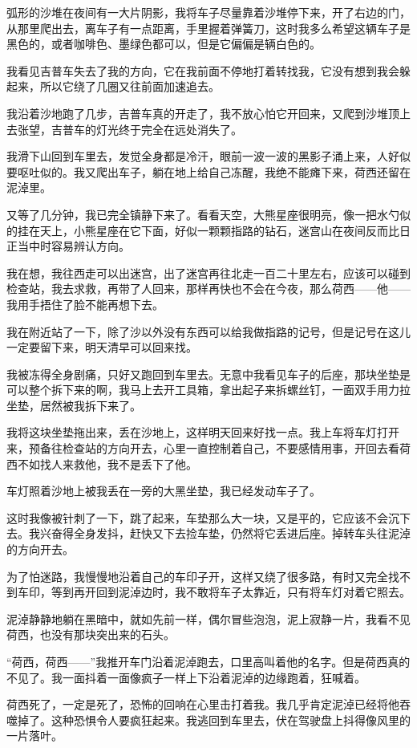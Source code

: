 \par 弧形的沙堆在夜间有一大片阴影，我将车子尽量靠着沙堆停下来，开了右边的门，从那里爬出去，离车子有一点距离，手里握着弹簧刀，这时我多么希望这辆车子是黑色的，或者咖啡色、墨绿色都可以，但是它偏偏是辆白色的。
\par 我看见吉普车失去了我的方向，它在我前面不停地打着转找我，它没有想到我会躲起来，所以它绕了几圈又往前面加速追去。
\par 我沿着沙地跑了几步，吉普车真的开走了，我不放心怕它开回来，又爬到沙堆顶上去张望，吉普车的灯光终于完全在远处消失了。
\par 我滑下山回到车里去，发觉全身都是冷汗，眼前一波一波的黑影子涌上来，人好似要呕吐似的。我又爬出车子，躺在地上给自己冻醒，我绝不能瘫下来，荷西还留在泥淖里。
\par 又等了几分钟，我已完全镇静下来了。看看天空，大熊星座很明亮，像一把水勺似的挂在天上，小熊星座在它下面，好似一颗颗指路的钻石，迷宫山在夜间反而比日正当中时容易辨认方向。
\par 我在想，我往西走可以出迷宫，出了迷宫再往北走一百二十里左右，应该可以碰到检查站，我去求救，再带了人回来，那样再快也不会在今夜，那么荷西——他——我用手捂住了脸不能再想下去。
\par 我在附近站了一下，除了沙以外没有东西可以给我做指路的记号，但是记号在这儿一定要留下来，明天清早可以回来找。
\par 我被冻得全身剧痛，只好又跑回到车里去。无意中我看见车子的后座，那块坐垫是可以整个拆下来的啊，我马上去开工具箱，拿出起子来拆螺丝钉，一面双手用力拉坐垫，居然被我拆下来了。
\par 我将这块坐垫拖出来，丢在沙地上，这样明天回来好找一点。我上车将车灯打开来，预备往检查站的方向开去，心里一直控制着自己，不要感情用事，开回去看荷西不如找人来救他，我不是丢下了他。
\par 车灯照着沙地上被我丢在一旁的大黑坐垫，我已经发动车子了。
\par 这时我像被针刺了一下，跳了起来，车垫那么大一块，又是平的，它应该不会沉下去。我兴奋得全身发抖，赶快又下去捡车垫，仍然将它丢进后座。掉转车头往泥淖的方向开去。
\par 为了怕迷路，我慢慢地沿着自己的车印子开，这样又绕了很多路，有时又完全找不到车印，等到再开回到泥淖边时，我不敢将车子太靠近，只有将车灯对着它照去。
\par 泥淖静静地躺在黑暗中，就如先前一样，偶尔冒些泡泡，泥上寂静一片，我看不见荷西，也没有那块突出来的石头。
\par “荷西，荷西——”我推开车门沿着泥淖跑去，口里高叫着他的名字。但是荷西真的不见了。我一面抖着一面像疯子一样上下沿着泥淖的边缘跑着，狂喊着。
\par 荷西死了，一定是死了，恐怖的回响在心里击打着我。我几乎肯定泥淖已经将他吞噬掉了。这种恐惧令人要疯狂起来。我逃回到车里去，伏在驾驶盘上抖得像风里的一片落叶。
